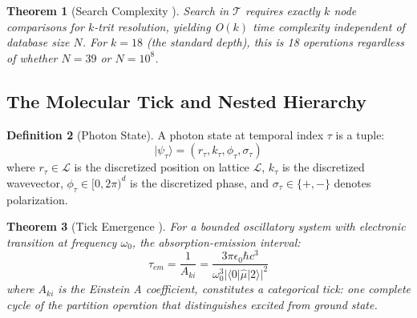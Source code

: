 \documentclass[11pt,a4paper]{article}
\newtheorem{theorem}{Theorem}[section]
\theoremstyle{definition}
\newtheorem{definition}[theorem]{Definition}
\theoremstyle{remark}
\begin{document}
\begin{theorem}[Search Complexity \cite{sachikonye2025categorical}]
\label{thm:search_complexity}
Search in $\mathcal{T}$ requires exactly $k$ node comparisons for $k$-trit resolution, yielding O$(k)$ time complexity independent of database size $N$. For $k = 18$ (the standard depth), this is 18 operations regardless of whether $N = 39$ or $N = 10^8$.
\end{theorem}

\subsection{The Molecular Tick and Nested Hierarchy}

\begin{definition}[Photon State]
\label{def:photon_state}
A photon state at temporal index $\tau$ is a tuple:
\begin{equation}
|\psi_\tau\rangle = (r_\tau, k_\tau, \phi_\tau, \sigma_\tau)
\end{equation}
where $r_\tau \in \mathcal{L}$ is the discretized position on lattice $\mathcal{L}$, $k_\tau$ is the discretized wavevector, $\phi_\tau \in [0,2\pi)^d$ is the discretized phase, and $\sigma_\tau \in \{+,-\}$ denotes polarization.
\end{definition}

\begin{theorem}[Tick Emergence \cite{sachikonye2026harmonic}]
\label{thm:tick_emergence}
For a bounded oscillatory system with electronic transition at frequency $\omega_0$, the absorption-emission interval:
\begin{equation}
\tau_{em} = \frac{1}{A_{ki}} = \frac{3\pi\epsilon_0\hbar c^3}{\omega_0^3|\langle 0|\hat{\mu}|2\rangle|^2}
\end{equation}
where $A_{ki}$ is the Einstein A coefficient, constitutes a categorical tick: one complete cycle of the partition operation that distinguishes excited from ground state.
\end{theorem}
\end{document}
